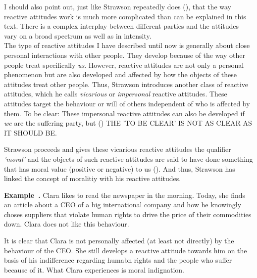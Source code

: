 \documentclass{article}
\newcounter{example}
\newenvironment{example}[1][]{\refstepcounter{example}\par\medskip
   \noindent \textbf{Example~\theexample. #1} \rmfamily}{\medskip}
\begin{document}

I should also point out, just like Strawson repeatedly does (\cite[p.5,
p.7]{Strawson1962}), that the way reactive attitudes work is much more
complicated than can be explained in this text. There is a complex
interplay between different parties and the attitudes vary on a broad spectrum
as well as in intensity.\\

The type of reactive attitudes I have described until now is generally about close
personal interactions with other people. They develop because of the way other
people treat specifically \textit{us}. 
However, reactive attitudes are not only a personal phenomenon but are also developed
and affected by how the objects of these attitudes treat other people.
Thus, Strawson introduces another class of reactive attitudes, which he calls
\textit{vicarious} or \textit{impersonal} reactive attitudes. These attitudes
target the behaviour or will of others independent of who is affected by them.
To be clear: These impersonal reactive attitudes can also be
developed if \textit{we} are the suffering party, but (\cite[p.15]{Strawson1962})
THE 'TO BE CLEAR' IS NOT AS CLEAR AS IT SHOULD BE.

Strawson proceeds and gives these vicarious reactive attitudes the
qualifier \textit{'moral'} and the objects of such reactive attitudes are said
to have done something that has moral value (positive or negative) to us
(\cite[p.15]{Strawson1962}). And thus, Strawson has linked the concept of
moralitiy with his reactive attitudes.


\begin{example}
	Clara likes to read the newspaper in the morning. Today, she finds an
	article about a CEO of a big international company and how he knowingly
	choses suppliers that violate human rights to drive the price of their
	commodities down. Clara does not like this behaviour.
\end{example}


It is clear that Clara is not personally affected (at least not directly) by the
behaviour of the CEO. She still develops a reactive attitude towards him on the
basis of his indifference regarding humabn rights and the people who suffer
because of it. What Clara experiences is moral indignation.
\end{document}
